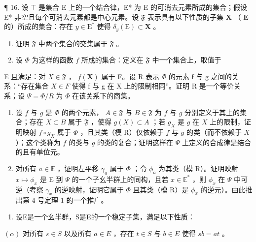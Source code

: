 ¶ 16. 设 \(\top\) 是集合 E 上的一个结合律，E* 为 E 的可消去元素所成的集合；假设 E* 非空且每个可消去元素都是中心元素。设 \(\mathfrak{F}\) 表示具有以下性质的子集 \(\mathbf{X}\) （ \(\mathbf{E}\) 的）所成的集合：存在 \(y \in \mathrm{E}^*\) 使得 \(\delta_y(\mathrm{E}) \subset \mathbf{X}\) 。

\begin{enumerate}
\def\labelenumi{(\alph{enumi})}
\item
  证明 \(\mathfrak{F}\) 中两个集合的交集属于 \(\mathfrak{F}\) 。
\item
  设 \(\Phi\) 为这样的函数 \(f\) 所成的集合：定义在 \(\mathfrak{F}\) 中一个集合上，取值于
\end{enumerate}

E 且满足：对 \(X \in \mathfrak{F}\) ， \(f(\mathbf{X})\) 属于 F。设 R 表示 \(\Phi\) 的元素 f 与 g 之间的关系：“存在集合 \(X \in F\) 使得 f 与 g 在 X 上的限制相同”。证明 R 是一个等价关系；设 \(\Psi = \Phi/R\) 为 \(\Phi\) 在该关系下的商集。

\begin{enumerate}
\def\labelenumi{(\alph{enumi})}
\setcounter{enumi}{2}
\item
  设 \(f\) 与 \(g\) 是 \(\Phi\) 的两个元素， \(A \in \mathfrak{F}\) 与 \(B \in \mathfrak{F}\) 为 \(f\) 与 \(g\) 分别定义于其上的集合；存在 \(X \subset B\) 属于 \(\mathfrak{F}\) ，使得 \(g(X) \subset A\) ；若 \(g_X\) 是 \(g\) 在 \(X\) 上的限制，证明映射 \(f \circ g_X\) 属于 \(\Phi\) ，且其类（模 R）仅依赖于 \(f\) 与 \(g\) 的类（而不依赖于 \(X\) ）；这个类称为 \(f\) 的类与 \(g\) 的类的复合；证明这样在 \(\Psi\) 上定义的合成律是结合的且有单位元。
\item
  对所有 \(a \in \mathbb{E}\) ，证明左平移 \(\gamma_{a}\) 属于 \(\Phi\) ；令 \(\phi_{a}\) 为其类（模 R）。证明映射 \(x \mapsto \phi_{x}\) 是 E 到 \(\Psi\) 的一个子幺半群上的同构，且若 \(x \in \mathbb{E}^{*}\) ，则 \(\phi_{x}\) 在 \(\Psi\) 中可逆（考察 \(\gamma_{x}\) 的逆映射，证明它属于 \(\Phi\) 且其类（模 R）是 \(\phi_{x}\) 的逆元）。由此推出第 4 号定理 1 的一个推广。
\end{enumerate}

\begin{enumerate}
\def\labelenumi{\arabic{enumi}.}
\setcounter{enumi}{16}
\tightlist
\item
  设E是一个幺半群，S是E的一个稳定子集，满足以下性质：
\end{enumerate}

\((\alpha)\) 对所有 \(s \in S\) 以及所有 \(a \in E\) ，存在 \(t \in S\) 与 \(b \in E\) 使得 \(sb = at\) 。

